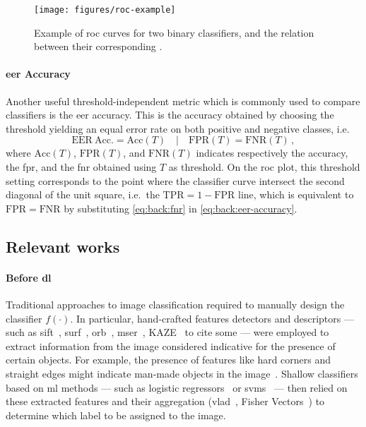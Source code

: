 \begin{figure}
    \centering
    \texttt{[image: figures/roc-example]}
    \caption{Example of \acrfull{roc} curves for two binary classifiers, and the relation between their corresponding . }
    \label{fig:back:roc}
\end{figure}

\paragraph{\acrshort{eer} Accuracy}
Another useful threshold-independent metric which is commonly used to compare classifiers is the \gls{eer} accuracy.
This is the accuracy obtained by choosing the threshold yielding an equal error rate on both positive and negative classes, i.e.
\begin{equation} \label{eq:back:eer-accuracy}
    \mathrm{EER\ Acc.} = \mathrm{Acc}(T) \quad | \quad \mathrm{FPR}(T) = \mathrm{FNR}(T) \,,
\end{equation}
where $\mathrm{Acc}(T)$, $\mathrm{FPR}(T)$, and $\mathrm{FNR}(T)$ indicates respectively the accuracy, the \gls{fpr}, and the \gls{fnr} obtained using $T$ as threshold.
On the \gls{roc} plot, this threshold setting corresponds to the point where the classifier curve intersect the second diagonal of the unit square, i.e.\ the $\mathrm{TPR} = 1 - \mathrm{FPR}$ line, which is equivalent to $\mathrm{FPR} = \mathrm{FNR}$ by substituting \ref{eq:back:fnr} in \ref{eq:back:eer-accuracy}.

\subsection{Relevant works}
\label{subsec:back:classif-relwork}

\paragraph{Before \acrlong{dl}}
Traditional approaches to image classification required to manually design the classifier $f(\cdot)$.
In particular, hand-crafted features detectors and descriptors --- such as \acrshort{sift}~\cite{lowe2004distinctive}, \acrshort{surf}~\cite{bay2006surf}, \acrshort{orb}~\cite{rublee2011orb}, \acrshort{mser}~\cite{matas2004robust}, KAZE~\cite{alcantarilla2012kaze} to cite some --- were employed to extract information from the image considered indicative for the presence of certain objects.
For example, the presence of features like hard corners and straight edges might indicate man-made objects in the image~\cite{piccinini2012real}.
Shallow classifiers based on \gls{ml} methods --- such as logistic regressors~\cite{mensink2012metric} or \glspl{svm}~\cite{arandjelovic2012three} --- then relied on these extracted features and their aggregation (\gls{vlad}~\cite{jegou2010aggregating}, Fisher Vectors~\cite{perronnin2010improving}) to determine which label to be assigned to the image.

